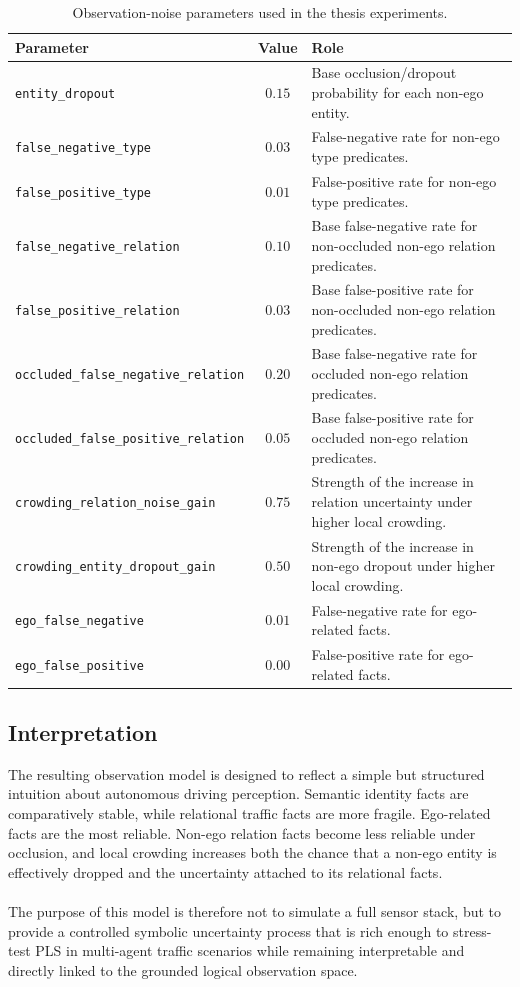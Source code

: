 \begin{table}[H]
\centering
\small
\caption{Observation-noise parameters used in the thesis experiments.}
\label{tab:observation-noise-parameters}
\begin{tabularx}{\linewidth}{@{}l c X@{}}
\toprule
\textbf{Parameter} & \textbf{Value} & \textbf{Role} \\
\midrule
\texttt{entity\_dropout} & \(0.15\) & Base occlusion/dropout probability for each non-ego entity. \\
\texttt{false\_negative\_type} & \(0.03\) & False-negative rate for non-ego type predicates. \\
\texttt{false\_positive\_type} & \(0.01\) & False-positive rate for non-ego type predicates. \\
\texttt{false\_negative\_relation} & \(0.10\) & Base false-negative rate for non-occluded non-ego relation predicates. \\
\texttt{false\_positive\_relation} & \(0.03\) & Base false-positive rate for non-occluded non-ego relation predicates. \\
\texttt{occluded\_false\_negative\_relation} & \(0.20\) & Base false-negative rate for occluded non-ego relation predicates. \\
\texttt{occluded\_false\_positive\_relation} & \(0.05\) & Base false-positive rate for occluded non-ego relation predicates. \\
\texttt{crowding\_relation\_noise\_gain} & \(0.75\) & Strength of the increase in relation uncertainty under higher local crowding. \\
\texttt{crowding\_entity\_dropout\_gain} & \(0.50\) & Strength of the increase in non-ego dropout under higher local crowding. \\
\texttt{ego\_false\_negative} & \(0.01\) & False-negative rate for ego-related facts. \\
\texttt{ego\_false\_positive} & \(0.00\) & False-positive rate for ego-related facts. \\
\bottomrule
\end{tabularx}
\end{table}

\subsection{Interpretation}

The resulting observation model is designed to reflect a simple but structured intuition about autonomous driving perception. Semantic identity facts are comparatively stable, while relational traffic facts are more fragile. Ego-related facts are the most reliable. Non-ego relation facts become less reliable under occlusion, and local crowding increases both the chance that a non-ego entity is effectively dropped and the uncertainty attached to its relational facts.
\\
\\
The purpose of this model is therefore not to simulate a full sensor stack, but to provide a controlled symbolic uncertainty process that is rich enough to stress-test PLS in multi-agent traffic scenarios while remaining interpretable and directly linked to the grounded logical observation space.


